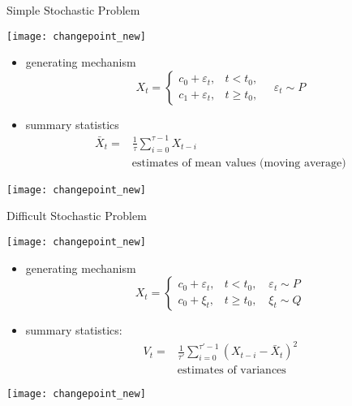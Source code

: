 \documentclass[fleqn,aspectratio=1610]{beamer}
\begin{document}
\begin{frame}[label={sec:orge40a37d},t]{Simple Stochastic Problem}
\begin{center}
\texttt{[image: changepoint\_new]}
\end{center}
\begin{overprint}
\begin{itemize}
\item generating mechanism
\begin{equation}
  X_{t}=
  \begin{cases}
    c_{0}+\varepsilon_{t},&t<t_{0},\\
    c_{1}+\varepsilon_{t},&t\geq t_{0},
  \end{cases}
  \quad \varepsilon_{t}\sim P
\end{equation}
\end{itemize}
\begin{itemize}
\item summary statistics
\begin{align}
  \bar{X}_{t}=
  &\frac{1}{\tau}\sum_{i=0}^{\tau-1}X_{t-i}\\
  &\text{estimates of mean values (moving average)}
\end{align}
\end{itemize}
\begin{center}
\texttt{[image: changepoint\_new]}      
\end{center}
\end{overprint}
\end{frame}

\begin{frame}[label={sec:org6ea7c5a},t]{Difficult Stochastic Problem}
\begin{center}
\texttt{[image: changepoint\_new]}
\end{center}
\begin{overprint}
\begin{itemize}
\item generating mechanism
\begin{equation}
  X_{t}=
  \begin{cases}
    c_{0}+\varepsilon_{t},&t<t_{0}, \quad \varepsilon_{t}\sim P\\
    c_{0}+\xi_{t},&t\geq t_{0}, \quad \xi_{t}\sim Q
  \end{cases}
\end{equation}
\end{itemize}
\begin{itemize}
\item summary statistics:
\begin{align}
  V_{t}=
  &\frac{1}{\tau'}\sum_{i=0}^{\tau'-1}(X_{t-i}-\bar{X}_{t})^{2}\\
  &\text{estimates of variances}
\end{align}
\end{itemize}
\begin{center}
\texttt{[image: changepoint\_new]}      
\end{center}
\end{overprint}
\end{frame}
\end{document}
